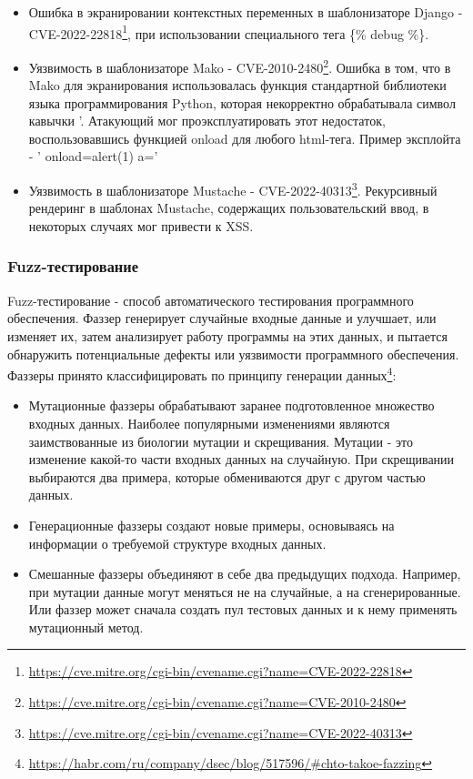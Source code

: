 \documentclass[a4paper]{article}
\begin{document}
\begin{itemize}
\item Ошибка в экранировании контекстных переменных в шаблонизаторе Django - CVE-2022-22818\footnote{\href{https://cve.mitre.org/cgi-bin/cvename.cgi?name=CVE-2022-22818}{https://cve.mitre.org/cgi-bin/cvename.cgi?name=CVE-2022-22818}}, при использовании специального тега \{\% debug \%\}.

\item Уязвимость в шаблонизаторе Mako - CVE-2010-2480\footnote{\href{https://cve.mitre.org/cgi-bin/cvename.cgi?name=CVE-2010-2480}{https://cve.mitre.org/cgi-bin/cvename.cgi?name=CVE-2010-2480}}. Ошибка в том, что в Mako для экранирования использовалась функция стандартной библиотеки языка программирования Python, которая некорректно обрабатывала символ кавычки '.  Атакующий мог проэксплуатировать этот недостаток, воспользовавшись функцией onload для любого html-тега. Пример эксплойта - ' onload=alert(1) a='
\item Уязвимость в шаблонизаторе Mustache - CVE-2022-40313\footnote{\href{https://cve.mitre.org/cgi-bin/cvename.cgi?name=CVE-2022-40313}{https://cve.mitre.org/cgi-bin/cvename.cgi?name=CVE-2022-40313}}. Рекурсивный рендеринг в шаблонах Mustache, содержащих пользовательский ввод, в некоторых случаях мог привести к XSS.
\end{itemize}

\subsubsection{Fuzz-тестирование}
\indent

Fuzz-тестирование - способ автоматического тестирования программного обеспечения. Фаззер генерирует случайные входные данные и улучшает, или изменяет их, затем анализирует работу программы на этих данных, и пытается обнаружить потенциальные дефекты или уязвимости программного обеспечения. Фаззеры принято классифицировать по принципу генерации данных\footnote{\href{https://habr.com/ru/company/dsec/blog/517596/\#chto-takoe-fazzing}{https://habr.com/ru/company/dsec/blog/517596/\#chto-takoe-fazzing}}:

\begin{itemize}
\item Мутационные фаззеры обрабатывают заранее подготовленное множество входных данных. Наиболее популярными изменениями являются заимствованные из биологии мутации и скрещивания. Мутации - это изменение какой-то части входных данных на случайную. При скрещивании выбираются два примера, которые обмениваются друг с другом частью данных.
\item Генерационные фаззеры создают новые примеры, основываясь на информации о требуемой структуре входных данных. 
\item Смешанные фаззеры объединяют в себе два предыдущих подхода. Например, при мутации данные могут меняться не на случайные, а на сгенерированные. Или фаззер может сначала создать пул тестовых данных и к нему применять мутационный метод. 
\end{itemize}
\end{document}

